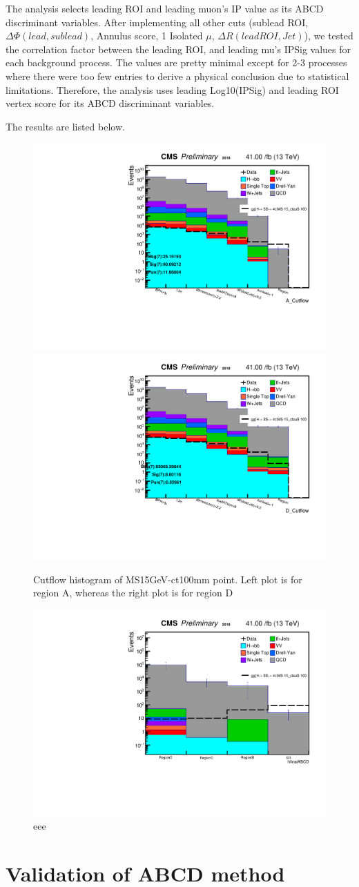 The analysis selects leading ROI and leading muon's IP value as its ABCD discriminant variables.
After implementing all other cuts (sublead ROI, $\Delta\Phi(lead,sublead)$, Annulus score, 1 Isolated $\mu$, $\Delta R(lead ROI, Jet)$), we tested the correlation factor between the leading ROI, and leading mu's IPSig values for each background process.
The values are pretty minimal except for 2-3 processes where there were too few entries to derive a physical conclusion due to statistical limitations.
Therefore, the analysis uses leading Log10(IPSig) and leading ROI vertex score for its ABCD discriminant variables.

The results are listed below.  


 \begin{figure}[h!]
   \caption{Cutflow histogram of MS15GeV-ct100mm point. Left plot is for region A, whereas the right plot is for region D}
   \label{fig:ABmethod}
   \centering
   \includegraphics[width=0.47\linewidth]{figs/AnalysisNoteplot_MS-15_ctauS-100_A_Cutflow.pdf}
   \includegraphics[width=0.47\linewidth]{figs/AnalysisNoteplot_MS-15_ctauS-100_D_Cutflow.pdf}
 \end{figure}

 \begin{figure}[h!]
   \caption{eee}
   \label{fig:ABCDmethod}
   \centering
   \includegraphics[width=0.67\linewidth]{figs/AnalysisNoteplot_MS-15_ctauS-100_hfinalABCD.pdf}
 \end{figure}

 \section{Validation of ABCD method}


